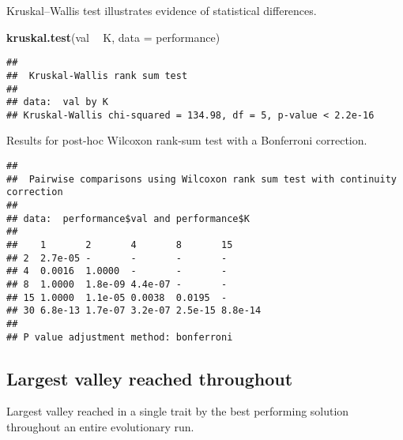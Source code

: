 \documentclass[]{book}
\newenvironment{Shaded}{\begin{snugshade}}{\end{snugshade}}
\newcommand{\DataTypeTok}[1]{\textcolor[rgb]{0.13,0.29,0.53}{#1}}
\newcommand{\KeywordTok}[1]{\textcolor[rgb]{0.13,0.29,0.53}{\textbf{#1}}}
\newcommand{\NormalTok}[1]{#1}
\newcommand{\OperatorTok}[1]{\textcolor[rgb]{0.81,0.36,0.00}{\textbf{#1}}}
\newcommand{\OtherTok}[1]{\textcolor[rgb]{0.56,0.35,0.01}{#1}}
\newcommand{\StringTok}[1]{\textcolor[rgb]{0.31,0.60,0.02}{#1}}
\begin{document}
Kruskal--Wallis test illustrates evidence of statistical differences.

\begin{Shaded}
\begin{Highlighting}[]
\KeywordTok{kruskal.test}\NormalTok{(val }\OperatorTok{~}\StringTok{ }\NormalTok{K, }\DataTypeTok{data =}\NormalTok{ performance)}
\end{Highlighting}
\end{Shaded}

\begin{verbatim}
## 
##  Kruskal-Wallis rank sum test
## 
## data:  val by K
## Kruskal-Wallis chi-squared = 134.98, df = 5, p-value < 2.2e-16
\end{verbatim}

Results for post-hoc Wilcoxon rank-sum test with a Bonferroni correction.

\begin{Shaded}
\end{Shaded}

\begin{verbatim}
## 
##  Pairwise comparisons using Wilcoxon rank sum test with continuity correction 
## 
## data:  performance$val and performance$K 
## 
##    1       2       4       8       15     
## 2  2.7e-05 -       -       -       -      
## 4  0.0016  1.0000  -       -       -      
## 8  1.0000  1.8e-09 4.4e-07 -       -      
## 15 1.0000  1.1e-05 0.0038  0.0195  -      
## 30 6.8e-13 1.7e-07 3.2e-07 2.5e-15 8.8e-14
## 
## P value adjustment method: bonferroni
\end{verbatim}

\hypertarget{largest-valley-reached-throughout-21}{%
\subsection{Largest valley reached throughout}\label{largest-valley-reached-throughout-21}}

Largest valley reached in a single trait by the best performing solution throughout an entire evolutionary run.
\end{document}
